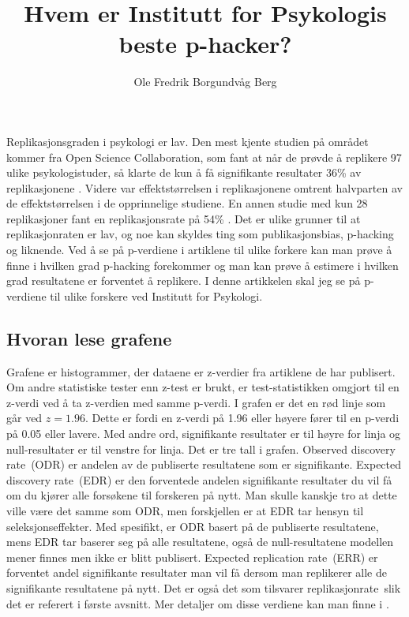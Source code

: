 \documentclass[doc,norsk]{apa7}
\title{Hvem er Institutt for Psykologis beste p-hacker?}
\author{Ole Fredrik Borgundvåg Berg}
\affiliation{NTNU}
\begin{document}
\maketitle

Replikasjonsgraden i psykologi er lav. Den mest kjente studien på området kommer fra Open Science Collaboration, som fant at når de prøvde å replikere 97 ulike psykologistuder, så klarte de kun å få signifikante resultater 36\% av replikasjonene \parencite{open-replikasjon}. Videre var effektstørrelsen i replikasjonene omtrent halvparten av de effektstørrelsen i de opprinnelige studiene. En annen studie med kun 28 replikasjoner fant en replikasjonsrate på 54\% \parencite{replikasjonsrate-2}. Det er ulike grunner til at replikasjonraten er lav, og noe kan skyldes ting som publikasjonsbias, p-hacking og liknende. Ved å se på p-verdiene i artiklene til ulike forkere kan man prøve å finne i hvilken grad p-hacking forekommer og man kan prøve å estimere i hvilken grad resultatene er forventet å replikere. I denne artikkelen skal jeg se på p-verdiene til ulike forskere ved Institutt for Psykologi. 

\subsection{Hvoran lese grafene}
Grafene er histogrammer, der dataene er z-verdier fra artiklene de har publisert. Om andre statistiske tester enn z-test er brukt, er test-statistikken omgjort til en z-verdi ved å ta z-verdien med samme p-verdi. I grafen er det en rød linje som går ved $z=1.96$. Dette er fordi en z-verdi på 1.96 eller høyere fører til en p-verdi på 0.05 eller lavere. Med andre ord, signifikante resultater er til høyre for linja og null-resultater er til venstre for linja. Det er tre tall i grafen. \guillemetleft Observed discovery rate\guillemetright\ (ODR) er andelen av de publiserte resultatene som er signifikante. \guillemetleft Expected discovery rate\guillemetright\ (EDR) er den forventede andelen signifikante resultater du vil få om du kjører alle forsøkene til forskeren på nytt. Man skulle kanskje tro at dette ville være det samme som ODR, men forskjellen er at EDR tar hensyn til seleksjonseffekter. Med spesifikt, er ODR basert på de publiserte resultatene, mens EDR tar baserer seg på alle resultatene, også de null-resultatene modellen mener finnes men ikke er blitt publisert. \guillemotleft Expected replication rate\guillemetright\ (ERR) er forventet andel signifikante resultater man vil få dersom man replikerer alle de signifikante resultatene på nytt. Det er også det som tilsvarer \guillemetleft replikasjonrate\guillemetright\ slik det er referert i første avsnitt. Mer detaljer om disse verdiene kan man finne i \textcite{z-curve-implementasjon}.
\end{document}
